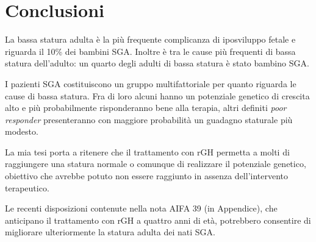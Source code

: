 \chapter{Conclusioni}

La bassa statura adulta è la più frequente complicanza di iposviluppo fetale e riguarda il 10\% dei bambini SGA.
Inoltre è tra le cause più frequenti di bassa statura dell'adulto: un quarto degli adulti di bassa statura è stato bambino SGA. 

I pazienti SGA costituiscono un gruppo multifattoriale per quanto riguarda le cause di bassa statura. Fra di loro alcuni hanno un potenziale genetico di crescita alto e più probabilmente risponderanno bene alla terapia, altri definiti \textit{poor responder} presenteranno con maggiore probabilità un guadagno staturale più modesto.

La mia tesi porta a ritenere che il trattamento con rGH permetta a molti di raggiungere una statura normale o comunque di realizzare il potenziale genetico, obiettivo che avrebbe potuto non essere raggiunto in assenza dell'intervento terapeutico. 

Le recenti disposizioni contenute nella nota AIFA 39 (in Appendice), che anticipano il trattamento con rGH  a quattro anni di età, potrebbero consentire di migliorare ulteriormente la statura adulta dei nati SGA.
